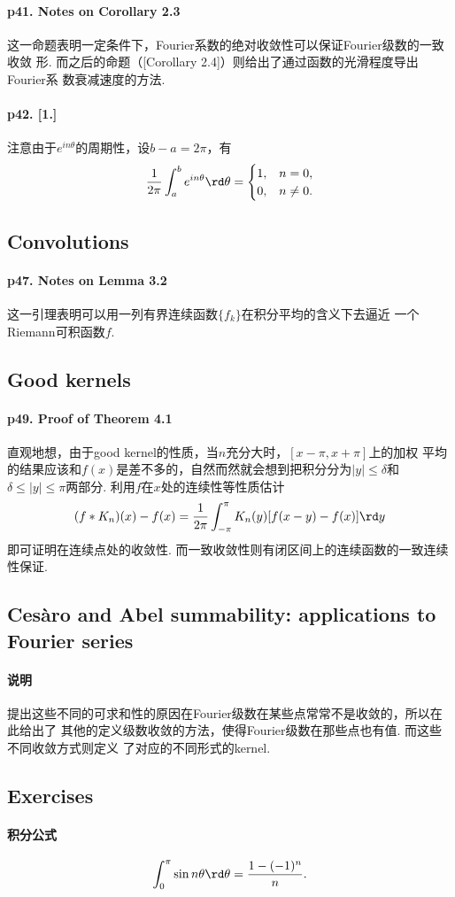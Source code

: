   \paragraph{p41. Notes on Corollary 2.3}
    这一命题表明一定条件下，Fourier系数的绝对收敛性可以保证Fourier级数的一致收敛
    形. 而之后的命题（[Corollary 2.4]）则给出了通过函数的光滑程度导出Fourier系
    数衰减速度的方法.

  \paragraph{p42. [1.]}
    注意由于$e^{in\theta}$的周期性，设$b-a=2\pi$，有
    \[
      \frac{1}{2\pi}\int_{a}^be^{in\theta}\rd\theta = 
      \begin{cases}
        1, & n = 0, \\
        0, & n \ne 0.
      \end{cases}
    \]

\subsection{Convolutions}
  \paragraph{p47. Notes on Lemma 3.2}
    这一引理表明可以用一列有界连续函数$\{f_k\}$在积分平均的含义下去逼近
    一个Riemann可积函数$f$.

\subsection{Good kernels}
  \paragraph{p49. Proof of Theorem 4.1}
    直观地想，由于good kernel的性质，当$n$充分大时，$[x-\pi,x+\pi]$上的加权
    平均的结果应该和$f(x)$是差不多的，自然而然就会想到把积分分为$|y|\le\delta$和
    $\delta\le|y|\le\pi$两部分. 利用$f$在$x$处的连续性等性质估计
    \[
      (f\ast K_n)(x) - f(x) = \frac{1}{2\pi}\int_{-\pi}^\pi
      K_n(y)[f(x-y)-f(x)]\rd y
    \]
    即可证明在连续点处的收敛性. 而一致收敛性则有闭区间上的连续函数的一致连续性保证.

\subsection{Cesàro and Abel summability: applications to Fourier series}
  \paragraph{说明}
    提出这些不同的可求和性的原因在Fourier级数在某些点常常不是收敛的，所以在此给出了
    其他的定义级数收敛的方法，使得Fourier级数在那些点也有值. 而这些不同收敛方式则定义
    了对应的不同形式的kernel.

  


\subsection{Exercises}
  \paragraph{积分公式}
  \[
    \int_0^\pi\sin n\theta\rd\theta = \frac{1-(-1)^n}{n}.
  \]




